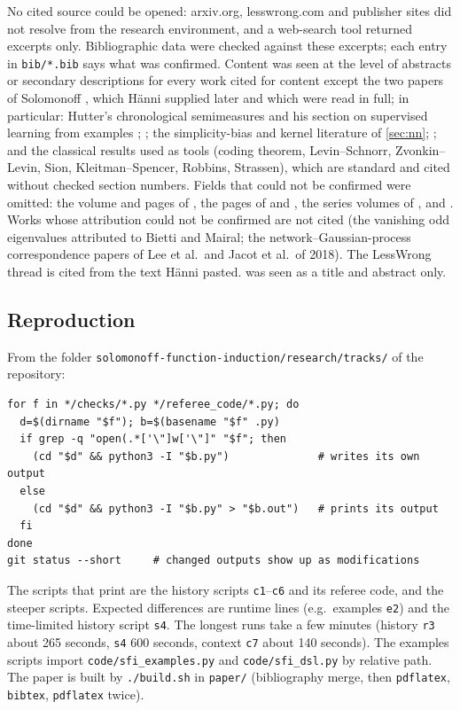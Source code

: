 No cited source could be opened: arxiv.org, lesswrong.com and publisher sites did not resolve from the research environment, and a web-search tool returned excerpts only. Bibliographic data were checked against these excerpts; each entry in \texttt{bib/*.bib} says what was confirmed. Content was seen at the level of abstracts or secondary descriptions for every work cited for content except the two papers of Solomonoff \citep{solomonoff1999two,solomonoff2008three}, which H\"anni supplied later and which were read in full; in particular: Hutter's chronological semimeasures and his section on supervised learning from examples \citep{hutter2000theory,hutter2005universal,hutter2007aixi}; \citet{lattimore2011universal,wood2013non,lattimore2013nofree,poland2005asymptotics,leike2015bad,leike2015computability,ryabko2006pattern}; the simplicity-bias and kernel literature of \cref{sec:nn}; \citet{impagliazzo1990no}; and the classical results used as tools (coding theorem, Levin--Schnorr, Zvonkin--Levin, Sion, Kleitman--Spencer, Robbins, Strassen), which are standard and cited without checked section numbers. Fields that could not be confirmed were omitted: the volume and pages of \citet{day2011increasing}, the pages of \citet{vovk1990aggregating} and \citet{basri2019convergence}, the series volumes of \citet{orseau2013universal}, \citet{schmidhuber2002speed} and \citet{wood2013non}. Works whose attribution could not be confirmed are not cited (the vanishing odd eigenvalues attributed to Bietti and Mairal; the network--Gaussian-process correspondence papers of Lee et al.\ and Jacot et al.\ of 2018). The LessWrong thread \citep{hanni2026lesswrong} is cited from the text H\"anni pasted.  was seen as a title and abstract only.

\subsection{Reproduction}\label{app:verification:repro}

From the folder \texttt{solomonoff-function-induction/research/tracks/} of the repository:
\begin{verbatim}
for f in */checks/*.py */referee_code/*.py; do
  d=$(dirname "$f"); b=$(basename "$f" .py)
  if grep -q "open(.*['\"]w['\"]" "$f"; then
    (cd "$d" && python3 -I "$b.py")              # writes its own output
  else
    (cd "$d" && python3 -I "$b.py" > "$b.out")   # prints its output
  fi
done
git status --short     # changed outputs show up as modifications
\end{verbatim}
The scripts that print are the history scripts \texttt{c1}--\texttt{c6} and its referee code, and the steeper scripts. Expected differences are runtime lines (e.g.\ examples \texttt{e2}) and the time-limited history script \texttt{s4}. The longest runs take a few minutes (history \texttt{r3} about 265 seconds, \texttt{s4} 600 seconds, context \texttt{c7} about 140 seconds). The examples scripts import \texttt{code/sfi\_examples.py} and \texttt{code/sfi\_dsl.py} by relative path. The paper is built by \texttt{./build.sh} in \texttt{paper/} (bibliography merge, then \texttt{pdflatex}, \texttt{bibtex}, \texttt{pdflatex} twice).

